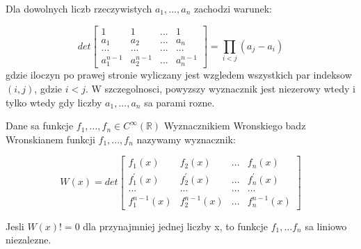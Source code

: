 \documentclass{article}
\begin{document}
\begin{tcolorbox}[colback=white!90!green,colframe=black!35!green,title=Fakt 2.16 Wyznacznik Vandermonde'a]

Dla dowolnych liczb rzeczywistych $a_{1},..., a_{n}$ zachodzi warunek:

$$det
\begin{bmatrix}
1 & 1 & ... & 1 \\
a_{1} & a_{2} & ... &a_{n} \\
... & ... & ... & ... \\
a_{1}^{n-1} & a_{2}^{n-1} & ... & a_{n}^{n-1} 
    
\end{bmatrix} = \prod_{i<j}(a_{j} - a_{i})
$$
gdzie iloczyn po prawej stronie wyliczany jest wzgledem wszystkich par indeksow $(i,j)$, gdzie $i<j$. W szczegolnosci, powyzszy wyznacznik jest niezerowy wtedy i tylko wtedy gdy liczby $a_{1},..., a_{n}$ sa parami rozne.

\end{tcolorbox}


\begin{tcolorbox}[colback=white!90!green,colframe=black!35!green,title=Lemat 2.20 Lemat Wronskiego (liniowa niezaleznosc w $C^{\infty}(\mathbb{R}$))]

Dane sa funkcje $f_{1},...,f_{n} \in C^{\infty}(\mathbb{R})$ Wyznacznikiem Wronskiego badz Wronskianem funkcji $f_{1},..., f_{n}$ nazywamy wyznacznik:

$$
W(x) = det
\begin{bmatrix}

f_{1}(x) & f_{2}(x) & ... & f_{n}(x) \\
f_{1}^{'}(x) & f_{2}^{'}(x) & ... & f_{n}^{'}(x) \\
... & ... & ... & ... \\
f_{1}^{n-1}(x) & f_{2}^{n-1}(x) & ... & f_{n}^{n-1}(x)
    
\end{bmatrix}
$$

Jesli $W(x) != 0$ dla przynajmniej jednej liczby x, to funkcje $f_{1},...f_{n}$ sa liniowo niezalezne.

\end{tcolorbox}
\end{document}
